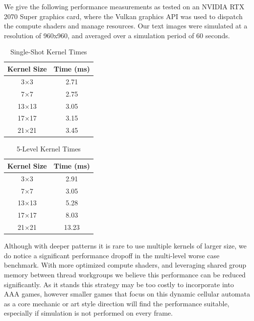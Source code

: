 \documentclass[twocolumn]{article}
\begin{document}
We give the following performance measurements as tested on an NVIDIA RTX 2070 Super graphics card, where the Vulkan graphics API was used to dispatch the compute shaders and manage resources. Our text images were simulated at a resolution of 960x960, and averaged over a simulation period of 60 seconds.

\begin{table}[h]
\centering
\begin{tabular}{|c|c|}
\hline
\textbf{Kernel Size} & \textbf{Time (ms)} \\
\hline
3$\times$3 & 2.71 \\
7$\times$7 & 2.75 \\
13$\times$13 & 3.05 \\
17$\times$17 & 3.15 \\
21$\times$21 & 3.45 \\
\hline
\end{tabular}
\caption{Single-Shot Kernel Times}
\label{tab:single-shot}
\end{table}

\begin{table}[h]
\centering
\begin{tabular}{|c|c|}
\hline
\textbf{Kernel Size} & \textbf{Time (ms)} \\
\hline
3$\times$3 & 2.91 \\
7$\times$7 & 3.05 \\
13$\times$13 & 5.28 \\
17$\times$17 & 8.03 \\
21$\times$21 & 13.23 \\
\hline
\end{tabular}
\caption{5-Level Kernel Times}
\label{tab:five-level}
\end{table}

Although with deeper patterns it is rare to use multiple kernels of larger size, we do notice a significant performance dropoff in the multi-level worse case benchmark. With more optimized compute shaders, and leveraging shared group memory between thread workgroups we believe this performance can be reduced significantly. As it stands this strategy may be too costly to incorporate into AAA games, however smaller games that focus on this dynamic cellular automata as a core mechanic or art style direction will find the performance suitable, especially if simulation is not performed on every frame.
\end{document}
